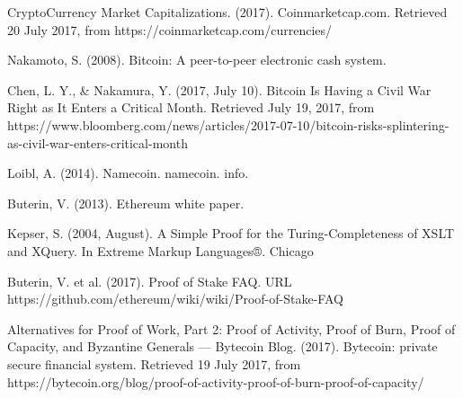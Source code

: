 \begin{thebibliography}{99}
CryptoCurrency Market Capitalizations. (2017). Coinmarketcap.com. Retrieved 20 July 2017, from https://coinmarketcap.com/currencies/

Nakamoto, S. (2008). Bitcoin: A peer-to-peer electronic cash system.

Chen, L. Y., \& Nakamura, Y. (2017, July 10). Bitcoin Is Having a Civil War Right as It Enters a Critical Month. Retrieved July 19, 2017, from https://www.bloomberg.com/news/articles/2017-07-10/bitcoin-risks-splintering-as-civil-war-enters-critical-month

Loibl, A. (2014). Namecoin. namecoin. info.

Buterin, V. (2013). Ethereum white paper.

Kepser, S. (2004, August). A Simple Proof for the Turing-Completeness of XSLT and XQuery. In Extreme Markup Languages®.
Chicago 

Buterin, V. et al. (2017). Proof of Stake FAQ. URL https://github.com/ethereum/wiki/wiki/Proof-of-Stake-FAQ

Alternatives for Proof of Work, Part 2: Proof of Activity, Proof of Burn, Proof of Capacity, and Byzantine Generals — Bytecoin Blog. (2017). Bytecoin: private secure financial system. Retrieved 19 July 2017, from https://bytecoin.org/blog/proof-of-activity-proof-of-burn-proof-of-capacity/

\end{thebibliography}
